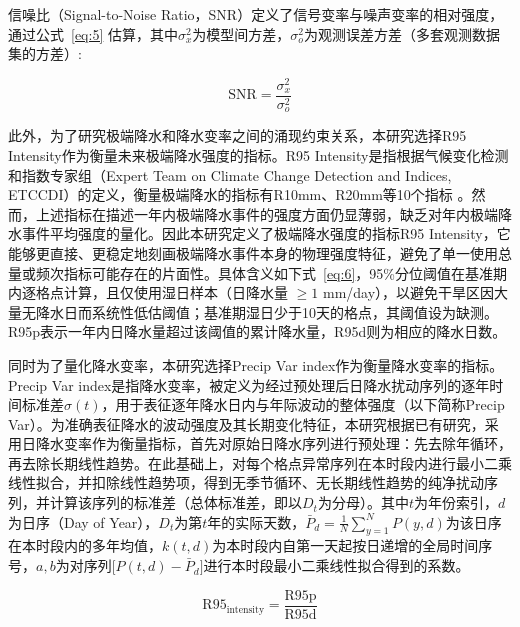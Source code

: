 \documentclass[draft]{agujournal2019}
\begin{document}
信噪比（Signal-to-Noise Ratio，SNR）定义了信号变率与噪声变率的相对强度，通过公式~\eqref{eq:5} 估算，其中\(\sigma_x^2\)为模型间方差，\(\sigma_o^2\)为观测误差方差（多套观测数据集的方差）:

\begin{linenomath*}
\begin{equation}
\mathrm{SNR} = \frac{\sigma_x^2}{\sigma_o^2}
\label{eq:5}
\end{equation}
\end{linenomath*}

此外，为了研究极端降水和降水变率之间的涌现约束关系，本研究选择R95 Intensity作为衡量未来极端降水强度的指标。R95 Intensity是指根据气候变化检测和指数专家组（Expert Team on Climate Change Detection and Indices, ETCCDI）的定义，衡量极端降水的指标有R10mm、R20mm等10个指标 \cite{zhang_indices_2011}。然而，上述指标在描述一年内极端降水事件的强度方面仍显薄弱，缺乏对年内极端降水事件平均强度的量化。因此本研究定义了极端降水强度的指标R95 Intensity，它能够更直接、更稳定地刻画极端降水事件本身的物理强度特征，避免了单一使用总量或频次指标可能存在的片面性。具体含义如下式~\eqref{eq:6}，95\%分位阈值在基准期内逐格点计算，且仅使用湿日样本（日降水量 \(\geq 1\) mm/day），以避免干旱区因大量无降水日而系统性低估阈值；基准期湿日少于10天的格点，其阈值设为缺测。R95p表示一年内日降水量超过该阈值的累计降水量，R95d则为相应的降水日数。

同时为了量化降水变率，本研究选择Precip Var index作为衡量降水变率的指标。Precip Var index是指降水变率，被定义为经过预处理后日降水扰动序列的逐年时间标准差\(\sigma(t)\)，用于表征逐年降水日内与年际波动的整体强度（以下简称Precip Var）。为准确表征降水的波动强度及其长期变化特征，本研究根据已有研究\cite{zhang_anthropogenic_2024}，采用日降水变率作为衡量指标，首先对原始日降水序列进行预处理：先去除年循环，再去除长期线性趋势。在此基础上，对每个格点异常序列在本时段内进行最小二乘线性拟合，并扣除线性趋势项，得到无季节循环、无长期线性趋势的纯净扰动序列，并计算该序列的标准差（总体标准差，即以\(D_t\)为分母）。其中\(t\)为年份索引，\(d\)为日序（Day of Year），\(D_t\)为第\(t\)年的实际天数，\(\bar{P}_d = \frac{1}{N}\sum_{y=1}^{N} P(y,d)\)为该日序在本时段内的多年均值，\(k(t,d)\)为本时段内自第一天起按日递增的全局时间序号，\(a,b\)为对序列\(\bigl[P(t,d)-\bar{P}_d\bigr]\)进行本时段最小二乘线性拟合得到的系数。

\begin{linenomath*}
\begin{equation}
\mathrm{R95_{intensity}} = \frac{\mathrm{R95p}}{\mathrm{R95d}}
\label{eq:6}
\end{equation}
\end{linenomath*}
\end{document}

